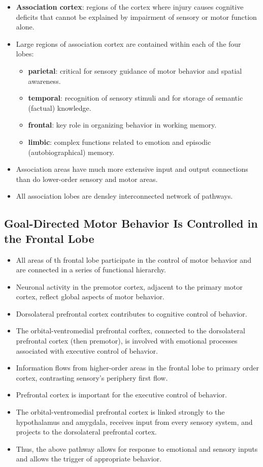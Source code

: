 \documentclass[12pt,a4paper]{article}
\begin{document}
\begin{itemize}
    \item \textbf{Association cortex}: regions of the cortex where injury causes cognitive deficits that cannot be explained by impairment of sensory or motor function alone.
    \item Large regions of association cortex are contained within each of the four lobes:
        \begin{itemize}
            \item \textbf{parietal}: critical for sensory guidance of motor behavior and spatial awareness.
            \item \textbf{temporal}: recognition of sensory stimuli and for storage of semantic (factual) knowledge.
            \item \textbf{frontal}: key role in organizing behavior in working memory.
            \item \textbf{limbic}: complex functions related to emotion and episodic (autobiographical) memory.
        \end{itemize}
    \item Association areas have much more extensive input and output connections than do lower-order sensory and motor areas.
    \item All association lobes are densley interconnected network of pathways.
\end{itemize}

\subsection{Goal-Directed Motor Behavior Is Controlled in the Frontal Lobe}
\begin{itemize}
    \item All areas of th frontal lobe participate in the control of motor behavior and are connected in a series of functional hierarchy.
    \item Neuronal activity in the premotor cortex, adjacent to the primary motor cortex, reflect global aspects of motor behavior.
    \item Dorsolateral prefrontal cortex contributes to cognitive control of behavior.
    \item The orbital-ventromedial prefrontal corftex, connected to the dorsolateral prefrontal cortex (then premotor), is involved with emotional processes associated with executive control of behavior.
    \item Information flows from higher-order areas in the frontal lobe to primary order cortex, contrasting sensory's periphery first flow.
    \item Prefrontal cortex is important for the executive control of behavior.
    \item The orbital-ventromedial prefrontal cortex is linked strongly to the hypothalamus and amygdala, receives input from every sensory system, and projects to the dorsolateral prefrontal cortex. 
    \item Thus, the above pathway allows for response to emotional and sensory inputs and allows the trigger of appropriate behavior.
\end{itemize}
\end{document}
